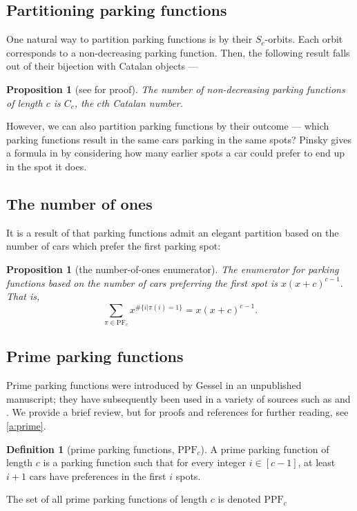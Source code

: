 \documentclass[12 pt]{amsart}
\newtheorem{proposition}[theorem]{Proposition}
\theoremstyle{definition} %
\newtheorem{definition}[theorem]{Definition}
\theoremstyle{remark} %
\begin{document}
\subsection{Partitioning parking functions} One natural way to partition parking functions is by their $S_{c}$-orbits. Each orbit corresponds to a non-decreasing parking function. Then, the following result falls out of their bijection with Catalan objects ---
\begin{proposition}[see \cite{armstrong-loehr-warrington-2016} for proof]
	The number of non-decreasing parking functions of length $c$ is $C_{c}$, the $c$th Catalan number.
\end{proposition}

However, we can also partition parking functions by their outcome --- which parking functions result in the same cars parking in the same spots? Pinsky gives a formula in \cite{pinsky-2024} by considering how many earlier spots a car could prefer to end up in the spot it does.

\subsection{The number of ones}

It is a result of \cite{yan-survey-2015} that parking functions admit an elegant partition based on the number of cars which prefer the first parking spot:

\begin{proposition}[the number-of-ones enumerator]
\label{prop:1s-enumerator}
    The enumerator for parking functions based on the number of cars preferring the first spot is $x(x+c)^{c-1}$. That is, 
\[
	\sum_{\pi \in \mathrm{PF}_c} x^{\#\{i|\pi(i)=1\}} = x (x + c)^{c - 1}.
\]
\end{proposition}

\subsection{Prime parking functions}

Prime parking functions were introduced by Gessel in an unpublished manuscript; they have subsequently been used in a variety of sources such as \cite{athanasiadis-linusson-1999} and \cite{meyles-2023}. We provide a brief review, but for proofs and references for further reading, see \cref{a:prime}.

\begin{definition}[prime parking functions, $\mathrm{PPF}_{c}$]
    A prime parking function of length $c$ is a parking function such that for every integer $i\in[c-1]$, at least $i+1$ cars have preferences in the first $i$ spots.

    The set of all prime parking functions of length $c$ is denoted $\mathrm{PPF}_{c}$
\end{definition}
\end{document}
